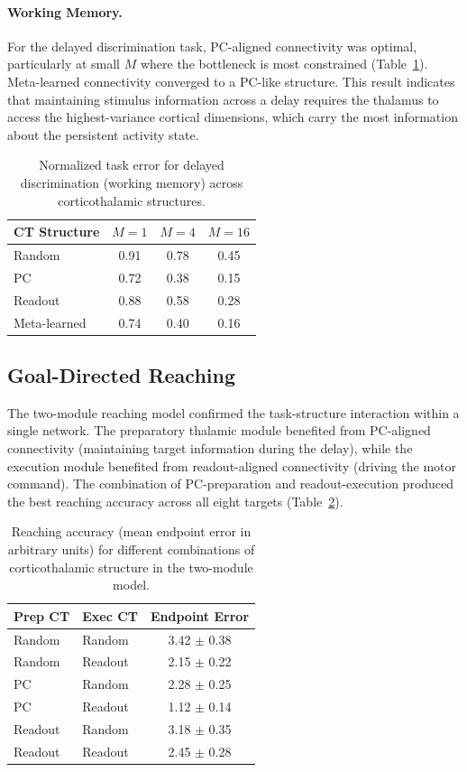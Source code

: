 \documentclass[11pt]{article}
\begin{document}
\paragraph{Working Memory.} For the delayed discrimination task, PC-aligned connectivity was optimal, particularly at small $M$ where the bottleneck is most constrained (Table~\ref{tab:wm_task}). Meta-learned connectivity converged to a PC-like structure. This result indicates that maintaining stimulus information across a delay requires the thalamus to access the highest-variance cortical dimensions, which carry the most information about the persistent activity state.

\begin{table}[htbp]
\centering
\caption{Normalized task error for delayed discrimination (working memory) across corticothalamic structures.}
\label{tab:wm_task}
\begin{tabular}{lccc}
\toprule
\textbf{CT Structure} & \textbf{$M=1$} & \textbf{$M=4$} & \textbf{$M=16$} \\
\midrule
Random & 0.91 & 0.78 & 0.45 \\
PC & 0.72 & 0.38 & 0.15 \\
Readout & 0.88 & 0.58 & 0.28 \\
Meta-learned & 0.74 & 0.40 & 0.16 \\
\bottomrule
\end{tabular}
\end{table}

\subsection{Goal-Directed Reaching}

The two-module reaching model confirmed the task-structure interaction within a single network. The preparatory thalamic module benefited from PC-aligned connectivity (maintaining target information during the delay), while the execution module benefited from readout-aligned connectivity (driving the motor command). The combination of PC-preparation and readout-execution produced the best reaching accuracy across all eight targets (Table~\ref{tab:reaching}).

\begin{table}[htbp]
\centering
\caption{Reaching accuracy (mean endpoint error in arbitrary units) for different combinations of corticothalamic structure in the two-module model.}
\label{tab:reaching}
\begin{tabular}{llc}
\toprule
\textbf{Prep CT} & \textbf{Exec CT} & \textbf{Endpoint Error} \\
\midrule
Random & Random & 3.42 $\pm$ 0.38 \\
Random & Readout & 2.15 $\pm$ 0.22 \\
PC & Random & 2.28 $\pm$ 0.25 \\
PC & Readout & 1.12 $\pm$ 0.14 \\
Readout & Random & 3.18 $\pm$ 0.35 \\
Readout & Readout & 2.45 $\pm$ 0.28 \\
\bottomrule
\end{tabular}
\end{table}
\end{document}
